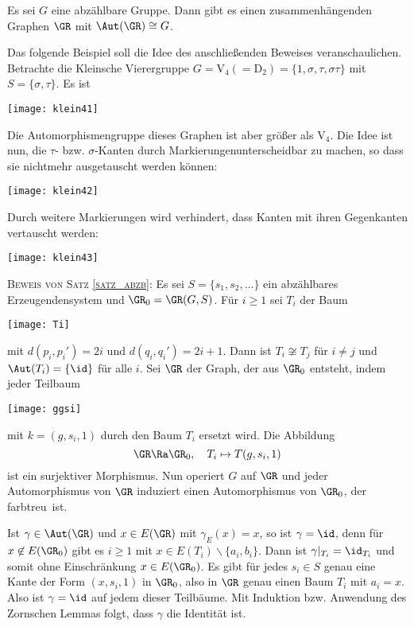 \SATZ\label{satz_abzb} Es sei $G$ eine abzählbare Gruppe. Dann gibt es einen
zusammenhängenden Graphen $\GR$ mit $\Aut(\GR)\cong G$.

Das folgende Beispiel soll die Idee des anschließenden Beweises
veranschaulichen.
\BSP Betrachte die Kleinsche Vierergruppe
$G=\mathrm{V}_4(=\mathrm{D}_2)=\{1,\sigma,\tau,\sigma\tau\}$
mit $S=\{\sigma,\tau\}$.
Es ist
\begin{center}
	\texttt{[image: klein41]}
\end{center}
Die Automorphismengruppe dieses Graphen ist aber größer als
$\mathrm{V}_4$. Die Idee ist nun, die $\tau$- bzw. $\sigma$-Kanten
durch \glqq Markierungen\grqq unterscheidbar zu machen,
so dass sie nichtmehr ausgetauscht werden können:
\begin{center}
	\texttt{[image: klein42]}
\end{center}
Durch weitere Markierungen wird verhindert, dass Kanten mit ihren
Gegenkanten vertauscht werden:
\begin{center}
	\texttt{[image: klein43]}
\end{center}

\textsc{Beweis von Satz \ref{satz_abzb}:}
Es sei $S=\{s_1, s_2, \ldots\}$ ein abzählbares Erzeugendensystem
und $\GR_0=\GR(G,S)$.
Für $i\geq 1$ sei $T_i$ der Baum
\begin{center}
	\texttt{[image: Ti]}
\end{center}
mit $d(p_i,p_i')=2i$ und $d(q_i,q_i')=2i+1$.
Dann ist $T_i\not\cong T_j$ für $i\neq j$ und $\Aut(T_i)=\{\id\}$
für alle $i$. Sei $\GR$ der Graph, der aus $\GR_0$ entsteht, indem
jeder Teilbaum
\begin{center}
	\texttt{[image: ggsi]}
\end{center}
mit $k=(g,s_i,1)$ durch den Baum $T_i$ ersetzt wird.
Die Abbildung
\[
\GR\Ra\GR_0,\quad T_i\mapsto T(g,s_i,1)
\]
ist ein surjektiver Morphismus.
Nun operiert $G$ auf $\GR$ und jeder Automorphismus von $\GR$
induziert einen Automorphismus von $\GR_0$, der \glqq farbtreu\grqq\
ist.

Ist $\gamma\in\Aut(\GR)$ und $x\in E(\GR)$ mit $\gamma_E(x)=x$,
so ist $\gamma=\id$, denn für $x\not\in E(\GR_0)$ gibt es $i\geq 1$
mit $x\in E(T_i)\backslash\{a_i,b_i\}$.
Dann ist $\gamma|_{T_i}=\id_{T_i}$ und somit ohne Einschränkung
$x\in E(\GR_0)$. Es gibt für jedes $s_i\in S$ genau eine Kante der
Form $(x,s_i,1)$ in $\GR_0$, also in $\GR$ genau einen Baum $T_i$
mit $a_i=x$. Also ist $\gamma=\id$ auf jedem dieser Teilbäume.
Mit Induktion bzw. Anwendung des Zornschen Lemmas folgt, dass
$\gamma$ die Identität ist.

